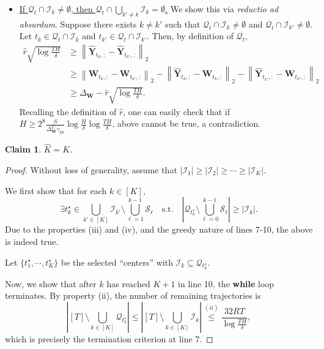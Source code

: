 \documentclass[twoside]{article}
\def\mW{{\bm{W}}}
\def\mY{{\bm{Y}}}
\def\gI{{\mathcal{I}}}
\def\gQ{{\mathcal{Q}}}
\def\gS{{\mathcal{S}}}
\theoremstyle{plain}
\newtheorem{claim}{Claim}[section]
\def\bignorm#1{\left\lVert #1 \right\rVert}
\def\bigabs#1{\left| #1 \right|}
\newcommand{\ps}{\mathrm{ps}}
\begin{document}
\begin{itemize}
    \item[(iv)] \underline{If $\gQ_t \cap \gI_k \neq \emptyset$, then $\gQ_t \cap \bigcup_{k' \neq k} \gI_k = \emptyset$.}
    We show this via \textit{reductio ad absurdum}.
    Suppose there exists $k \neq k'$ such that $\gQ_t \cap \gI_k \neq \emptyset$ and $\gQ_t \cap \gI_{k'} \neq \emptyset$.
    Let $t_k \in \gQ_t \cap \gI_k$ and $t_{k'} \in \gQ_t \cap \gI_{k'}$.
    Then, by definition of $\gQ_t$,
    \begin{align*}
        \widehat{r} \sqrt{\log\frac{TH}{\delta}} &\geq \bignorm{\widehat{\mY}_{t_k,:} - \widehat{\mY}_{t_{k'},:}}_2  \\
        &\geq \bignorm{\mW_{t_k,:} - \mW_{t_{k'},:}}_2 - \bignorm{\widehat{\mY}_{t_k,:} - \mW_{t_k,:}}_2 - \bignorm{\widehat{\mY}_{t_{k'},:} - \mW_{t_{k'},:}}_2 \\
        &\geq \Delta_\mW - \widehat{r} \sqrt{\log\frac{TH}{\delta}}.
    \end{align*}
    Recalling the definition of $\widehat{r}$, one can easily check that if $H \geq 2^8 \frac{S}{\Delta_\mW^2 \gamma_\ps} \log\frac{H}{\delta} \log\frac{TH}{\delta}$, above cannot be true, a contradiction.
\end{itemize}

\begin{claim}
    $\widehat{K} = K$.
\end{claim}
\begin{proof}
    Without loss of generality, assume that $|\gI_1| \geq |\gI_2| \geq \cdots \geq |\gI_K|$.
    
    We first show that for each $k \in [K]$,
    \begin{equation*}
        \exists t_k^\star \in \bigcup_{k' \in [K]} \gI_{k'} \setminus \bigcup_{\ell=1}^{k-1} \gS_\ell \quad \text{s.t.} \quad \bigabs{\gQ_{t_k^\star} \setminus \bigcup_{\ell=0}^{k-1} \gS_\ell} \geq |\gI_k|.
    \end{equation*}
    Due to the properties (iii) and (iv), and the greedy nature of lines 7-10, the above is indeed true.
    
    Let $\{t_1^\star, \cdots, t_K^\star\}$ be the selected ``centers'' with $\gI_k \subseteq \gQ_{t_k^\star}$.

    Now, we show that after $k$ has reached $K + 1$ in line 10, the \textbf{while} loop terminates.
    By property (ii), the number of remaining trajectories is
    \begin{equation*}
        \bigabs{[T] \setminus \bigcup_{k \in [K]} \gQ_{t_k^\star}}
        \leq \bigabs{[T] \setminus \bigcup_{k \in [K]} \gI_k}
        \overset{(ii)}{\leq} \frac{32 R T}{\log\frac{TH}{\delta}},
    \end{equation*}
    which is precisely the termination criterion at line 7.
\end{proof}
\end{document}
